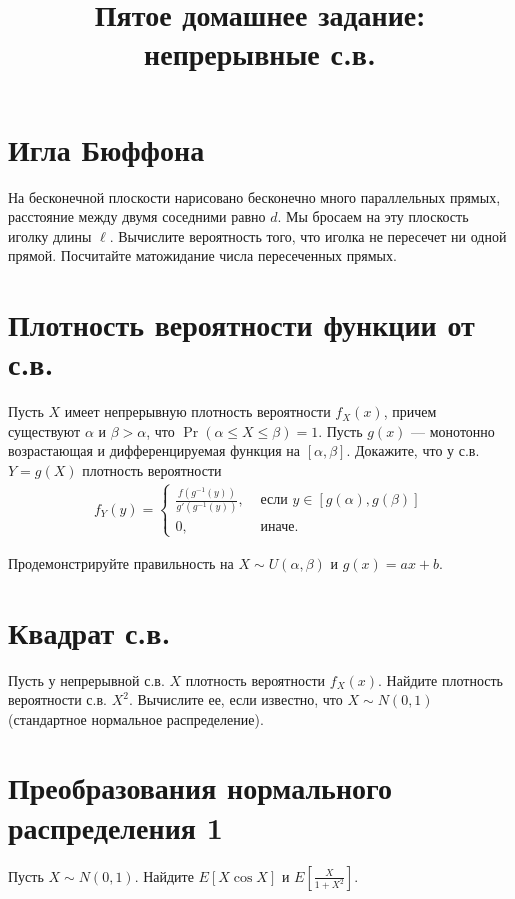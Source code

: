\documentclass[12pt]{article}
\title{Пятое домашнее задание: непрерывные с.в.}
\begin{document}
\maketitle

\section{Игла Бюффона}

На бесконечной плоскости нарисовано бесконечно много параллельных прямых, расстояние между двумя соседними равно $d$. Мы бросаем на эту плоскость иголку длины $\ell$. Вычислите вероятность того, что иголка не пересечет ни одной прямой. Посчитайте матожидание числа пересеченных прямых.

\section{Плотность вероятности функции от с.в.}

Пусть $X$ имеет непрерывную плотность вероятности $f_X(x)$, причем существуют $\alpha$ и $\beta > \alpha$, что $\Pr(\alpha \le X \le \beta) = 1$. Пусть $g(x)$ --- монотонно возрастающая и дифференцируемая функция на $[\alpha, \beta]$. Докажите, что у с.в. $Y = g(X)$ плотность вероятности
\begin{align*}
    f_Y(y) = \begin{cases}
        \frac{f(g^{-1}(y))}{g'(g^{-1}(y))}, &\text{ если } y \in [g(\alpha), g(\beta)] \\
        0, &\text{ иначе.}
    \end{cases}
\end{align*}

Продемонстрируйте правильность на $X \sim U(\alpha, \beta)$ и $g(x) = ax + b$. 

\section{Квадрат с.в.}

Пусть у непрерывной с.в. $X$ плотность вероятности $f_X(x)$. Найдите плотность вероятности с.в. $X^2$. Вычислите ее, если известно, что $X \sim N(0, 1)$ (стандартное нормальное распределение).

\section{Преобразования нормального распределения 1}

Пусть $X \sim N(0, 1)$. Найдите $E[X\cos X]$ и $E[\frac{X}{1 + X^2}]$.
\end{document}
